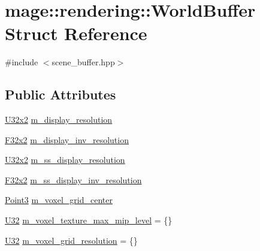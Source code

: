 \hypertarget{structmage_1_1rendering_1_1_world_buffer}{}\section{mage\+:\+:rendering\+:\+:World\+Buffer Struct Reference}
\label{structmage_1_1rendering_1_1_world_buffer}


{\ttfamily \#include $<$scene\+\_\+buffer.\+hpp$>$}

\subsection*{Public Attributes}
\begin{DoxyCompactItemize}
\item 
\mbox{\hyperlink{namespacemage_ae5e7ccf8a1785baaacf57b3a0f4324e2}{U32x2}} \mbox{\hyperlink{structmage_1_1rendering_1_1_world_buffer_aafc4835b9b42d7688b3930768f732ea0}{m\+\_\+display\+\_\+resolution}}
\item 
\mbox{\hyperlink{namespacemage_aee4759dedc8def6c6dec26b5c7eddf29}{F32x2}} \mbox{\hyperlink{structmage_1_1rendering_1_1_world_buffer_a14b9521f67adaa823bdb9c45d833be1a}{m\+\_\+display\+\_\+inv\+\_\+resolution}}
\item 
\mbox{\hyperlink{namespacemage_ae5e7ccf8a1785baaacf57b3a0f4324e2}{U32x2}} \mbox{\hyperlink{structmage_1_1rendering_1_1_world_buffer_a76def4c6b834b74a9505464d5f6192e5}{m\+\_\+ss\+\_\+display\+\_\+resolution}}
\item 
\mbox{\hyperlink{namespacemage_aee4759dedc8def6c6dec26b5c7eddf29}{F32x2}} \mbox{\hyperlink{structmage_1_1rendering_1_1_world_buffer_adf6234210cd9c50065016b2445946651}{m\+\_\+ss\+\_\+display\+\_\+inv\+\_\+resolution}}
\item 
\mbox{\hyperlink{structmage_1_1_point3}{Point3}} \mbox{\hyperlink{structmage_1_1rendering_1_1_world_buffer_af62ba25b808701284c93fe2ccf4541c9}{m\+\_\+voxel\+\_\+grid\+\_\+center}}
\item 
\mbox{\hyperlink{namespacemage_aa5d6eaabaac3cdd01873d6a3d27e90f3}{U32}} \mbox{\hyperlink{structmage_1_1rendering_1_1_world_buffer_af891d0c776313dcf06048d78a2ad4853}{m\+\_\+voxel\+\_\+texture\+\_\+max\+\_\+mip\+\_\+level}} = \{\}
\item 
\mbox{\hyperlink{namespacemage_aa5d6eaabaac3cdd01873d6a3d27e90f3}{U32}} \mbox{\hyperlink{structmage_1_1rendering_1_1_world_buffer_ad1a59cf980681b0b9ec246057fe2ed70}{m\+\_\+voxel\+\_\+grid\+\_\+resolution}} = \{\}
\item 

\end{DoxyCompactItemize}
